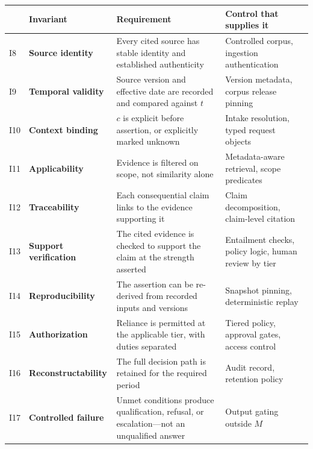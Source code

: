 \documentclass[11pt]{article}
\theoremstyle{plain}
\theoremstyle{definition}
\begin{document}
\begin{table}[ht]
  \centering
  \small
  \begin{tabular}{@{}>{\raggedright\arraybackslash}p{0.7cm}>{\raggedright\arraybackslash}p{3.3cm}>{\raggedright\arraybackslash}p{4.6cm}>{\raggedright\arraybackslash}p{4.4cm}@{}}
    \toprule
    & Invariant & Requirement & Control that supplies it \\
    \midrule
    I8 & \textbf{Source identity}
       & Every cited source has stable identity and established authenticity
       & Controlled corpus, ingestion authentication \\
    \addlinespace
    I9 & \textbf{Temporal validity}
       & Source version and effective date are recorded and compared against $t$
       & Version metadata, corpus release pinning \\
    \addlinespace
    I10 & \textbf{Context binding}
       & $c$ is explicit before assertion, or explicitly marked unknown
       & Intake resolution, typed request objects \\
    \addlinespace
    I11 & \textbf{Applicability}
       & Evidence is filtered on scope, not similarity alone
       & Metadata-aware retrieval, scope predicates \\
    \addlinespace
    I12 & \textbf{Traceability}
       & Each consequential claim links to the evidence supporting it
       & Claim decomposition, claim-level citation \\
    \addlinespace
    I13 & \textbf{Support verification}
       & The cited evidence is checked to support the claim at the strength asserted
       & Entailment checks, policy logic, human review by tier \\
    \addlinespace
    I14 & \textbf{Reproducibility}
       & The assertion can be re-derived from recorded inputs and versions
       & Snapshot pinning, deterministic replay \\
    \addlinespace
    I15 & \textbf{Authorization}
       & Reliance is permitted at the applicable tier, with duties separated
       & Tiered policy, approval gates, access control \\
    \addlinespace
    I16 & \textbf{Reconstructability}
       & The full decision path is retained for the required period
       & Audit record, retention policy \\
    \addlinespace
    I17 & \textbf{Controlled failure}
       & Unmet conditions produce qualification, refusal, or escalation---not an
         unqualified answer
       & Output gating outside $M$ \\

\end{tabular}
\end{table}
\end{document}
